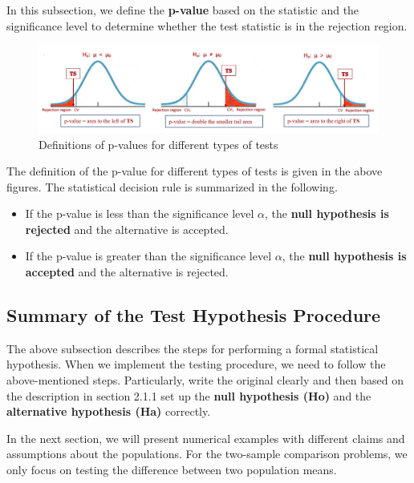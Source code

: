 \documentclass[
]{book}
\begin{document}
In this subsection, we define the \textbf{p-value} based on the statistic and the significance level to determine whether the test statistic is in the rejection region.

\begin{figure}

{\centering \includegraphics[width=0.8\linewidth]{img07/w07-p-values} 

}

\caption{Definitions of p-values for different types of tests}\label{fig:unnamed-chunk-112}
\end{figure}

The definition of the p-value for different types of tests is given in the above figures. The statistical decision rule is summarized in the following.

\begin{itemize}
\item
  If the p-value is less than the significance level \(\alpha\), the \textbf{null hypothesis is rejected} and the alternative is accepted.
\item
  If the p-value is greater than the significance level \(\alpha\), the \textbf{null hypothesis is accepted} and the alternative is rejected.
\end{itemize}

\hypertarget{summary-of-the-test-hypothesis-procedure}{%
\subsection{Summary of the Test Hypothesis Procedure}\label{summary-of-the-test-hypothesis-procedure}}

The above subsection describes the steps for performing a formal statistical hypothesis. When we implement the testing procedure, we need to follow the above-mentioned steps. Particularly, write the original clearly and then based on the description in section 2.1.1 set up the \textbf{null hypothesis (Ho)} and the \textbf{alternative hypothesis (Ha)} correctly.

In the next section, we will present numerical examples with different claims and assumptions about the populations. For the two-sample comparison problems, we only focus on testing the difference between two population means.
\end{document}
